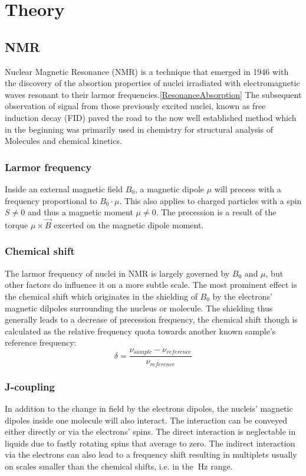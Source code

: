 \chapter{Theory}\label{chap:theory}
	\section{NMR}
		Nuclear Magnetic Resonance (NMR) is a technique that emerged in 1946 with the discovery
		of the absortion properties of nuclei irradiated with electromagnetic waves resonant to their
		larmor frequencies.\ref{ResonanceAbsorption} The subsequent observation of signal from those
		previously excited nuclei, known as free induction decay (FID) paved the road to the now well
		established method which in the beginning was primarily used in chemistry for structural
		analysis of Molecules and chemical kinetics.
		\subsection{Larmor frequency}
			Inside an external magnetic field $B_0$, a magnetic dipole $\mu$ will precess with a frequency
			proportional to $B_0\cdot \mu$. This also applies to charged particles with a spin $S\neq0$ and thus
			a magnetic moment $\mu\neq0$. The precession is a result of the torque $\mu\times\vec B$
			excerted on the magnetic dipole moment.
		\subsection{Chemical shift}
			The larmor frequency of nuclei in NMR is largely governed by $B_0$ and $\mu$, but other factors do
			influence it on a more subtle scale. The most prominent effect is the chemical shift which
			originates in the shielding of $B_0$ by the electrons' magnetic dilpoles surrounding the nucleus or molecule.
			The shielding thus generally leads to a decrease of precession frequency, the chemical shift
			though is calculated as the relative frequency quota towards another known sample's
			reference frequency:
			\begin{equation}
				\delta = \frac{\nu_{sample} - \nu_{reference}}{\nu_{reference}}
			\end{equation}
		\subsection{J-coupling}
			In addition to the change in field by the electrons dipoles, the nucleis' magnetic
			dipoles inside one molecule will also interact. The interaction can be conveyed either
			directly or via the electrons' spins. The direct interaction is neglectable in liquids
			due to fastly rotating spins that average to zero. The indirect interaction via the
			electrons can also lead to a frequency shift resulting in multiplets usually on scales
			smaller than the chemical shifts, i.e. in the $\SI{}{\hertz}$ range.
